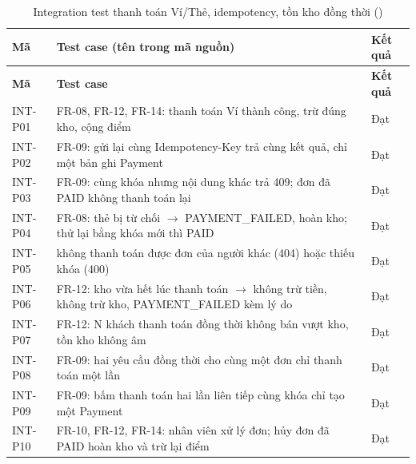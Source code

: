 {\small
\begin{longtable}{@{}L{1.9cm}L{10.6cm}L{1.3cm}@{}}
\caption{Integration test thanh toán Ví/Thẻ, idempotency, tồn kho đồng thời ()}\label{tab:intp}\\
\toprule
\textbf{Mã} & \textbf{Test case (tên trong mã nguồn)} & \textbf{Kết quả} \\ \midrule \endfirsthead
\toprule \textbf{Mã} & \textbf{Test case} & \textbf{Kết quả} \\ \midrule \endhead
\bottomrule \endfoot
INT-P01 & FR-08, FR-12, FR-14: thanh toán Ví thành công, trừ đúng kho, cộng điểm & Đạt \\
INT-P02 & FR-09: gửi lại cùng Idempotency-Key trả cùng kết quả, chỉ một bản ghi Payment & Đạt \\
INT-P03 & FR-09: cùng khóa nhưng nội dung khác trả 409; đơn đã PAID không thanh toán lại & Đạt \\
INT-P04 & FR-08: thẻ bị từ chối $\rightarrow$ PAYMENT\_FAILED, hoàn kho; thử lại bằng khóa mới thì PAID & Đạt \\
INT-P05 & không thanh toán được đơn của người khác (404) hoặc thiếu khóa (400) & Đạt \\
INT-P06 & FR-12: kho vừa hết lúc thanh toán $\rightarrow$ không trừ tiền, không trừ kho, PAYMENT\_FAILED kèm lý do & Đạt \\
INT-P07 & FR-12: N khách thanh toán đồng thời không bán vượt kho, tồn kho không âm & Đạt \\
INT-P08 & FR-09: hai yêu cầu đồng thời cho cùng một đơn chỉ thanh toán một lần & Đạt \\
INT-P09 & FR-09: bấm thanh toán hai lần liên tiếp cùng khóa chỉ tạo một Payment & Đạt \\
INT-P10 & FR-10, FR-12, FR-14: nhân viên xử lý đơn; hủy đơn đã PAID hoàn kho và trừ lại điểm & Đạt \\
\end{longtable}
}